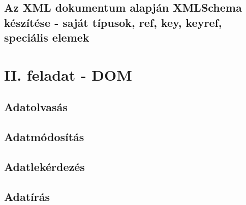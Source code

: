 \documentclass[12pt]{report}
\begin{document}
\section{Az XML dokumentum alapján XMLSchema készítése - saját típusok, ref, key, keyref, speciális elemek}
\chapter{II. feladat - DOM}
\section{Adatolvasás}
\section{Adatmódosítás}
\section{Adatlekérdezés}
\section{Adatírás}
\end{document}
